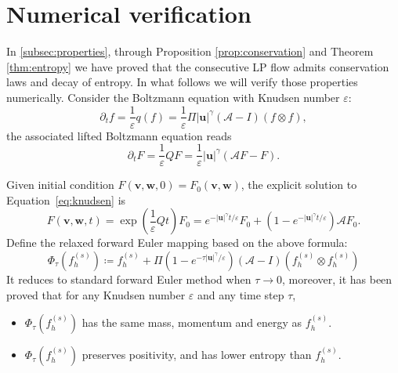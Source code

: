 \documentclass{article}
\numberwithin{equation}{section}
\begin{document}
\section{Numerical verification}\label{sec:verify}
In \ref{subsec:properties}, through Proposition \ref{prop:conservation} and Theorem \ref{thm:entropy} we have proved that the consecutive LP flow admits conservation laws and decay of entropy. In what follows we will verify those properties numerically. Consider the Boltzmann equation with Knudsen number $\varepsilon$:
\begin{equation*}
    \partial_{t} f = \frac{1}{\varepsilon}q(f)  = \frac{1}{\varepsilon} \Pi \lvert \mathbf{u}\rvert^{\gamma} (\mathcal{A}-I)(f\otimes f),
\end{equation*}
the associated lifted Boltzmann equation reads
\begin{equation}\label{eq:knudsen}
    \partial_{t} F = \frac{1}{\varepsilon}QF =\frac{1}{\varepsilon}\lvert \mathbf{u} \rvert^{\gamma} \left(\mathcal{A} F - F\right).
\end{equation}

Given initial condition $F(\mathbf{v}, \mathbf{w}, 0) = F_{0}(\mathbf{v}, \mathbf{w})$, the explicit solution to Equation~\eqref{eq:knudsen} is
\begin{equation*}
    F(\mathbf{v}, \mathbf{w}, t) = \exp(\frac{1}{\varepsilon}Qt) F_{0} = e^{-\lvert \mathbf{u} \rvert^{\gamma}t/\varepsilon} F_{0} + \left(1-e^{-\lvert \mathbf{u} \rvert^{\gamma}t/\varepsilon}\right) \mathcal{A} F_{0}.
\end{equation*}
Define the relaxed forward Euler mapping based on the above formula:
\begin{equation}\label{eq:relaxed_Euler}
    \Phi_{\tau}\left(f_{h}^{(s)}\right) \coloneqq f^{(s)}_{h} + \Pi (1-e^{-\tau \lvert \mathbf{u} \rvert^{\gamma}/\varepsilon})(\mathcal{A}-I)(f_{h}^{(s)}\otimes f_{h}^{(s)})
\end{equation}
It reduces to standard forward Euler method when $\tau \rightarrow 0$, moreover, it has been proved that for any Knudsen number $\varepsilon$ and any time step $\tau$, 
\begin{itemize}
    \item $\Phi_{\tau}\left(f_{h}^{(s)}\right)$ has the same mass, momentum and energy as $f_{h}^{(s)}$.
    \item $\Phi_{\tau}\left(f_{h}^{(s)}\right)$ preserves positivity, and has lower entropy than $f_{h}^{(s)}$.
\end{itemize}
\end{document}
